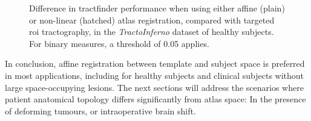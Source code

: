 \begin{figure}
  \caption{Difference in tractfinder performance when using either affine (plain) or non-linear (hatched) atlas registration, compared with targeted \gls{roi} tractography, in the \textit{TractoInferno} dataset of healthy subjects. For binary measures, a threshold of 0.05 applies.}
  \label{fig:nrr}
\end{figure}

In conclusion, affine registration between template and subject space is preferred in most applications, including for healthy subjects and clinical subjects without large space-occupying lesions.
The next sections will address the scenarios where patient anatomical topology differs significantly from atlas space:
In the presence of deforming tumours, or intraoperative brain shift.
